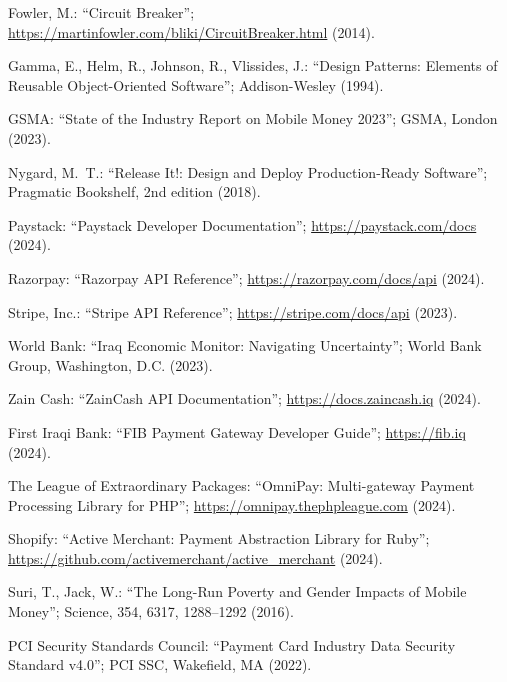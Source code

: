 \documentclass[10pt, a4paper, oneside]{article}
\begin{document}
\begin{thebibliography}{}{
\fontsize{9pt}{10pt}\selectfont

 Fowler, M.: ``Circuit Breaker''; \url{https://martinfowler.com/bliki/CircuitBreaker.html} (2014).

 Gamma, E., Helm, R., Johnson, R., Vlissides, J.: ``Design Patterns: Elements of Reusable Object-Oriented Software''; Addison-Wesley (1994).

 GSMA: ``State of the Industry Report on Mobile Money 2023''; GSMA, London (2023).

 Nygard, M.~T.: ``Release It!: Design and Deploy Production-Ready Software''; Pragmatic Bookshelf, 2nd edition (2018).

 Paystack: ``Paystack Developer Documentation''; \url{https://paystack.com/docs} (2024).

 Razorpay: ``Razorpay API Reference''; \url{https://razorpay.com/docs/api} (2024).

 Stripe, Inc.: ``Stripe API Reference''; \url{https://stripe.com/docs/api} (2023).

 World Bank: ``Iraq Economic Monitor: Navigating Uncertainty''; World Bank Group, Washington, D.C. (2023).

 Zain Cash: ``ZainCash API Documentation''; \url{https://docs.zaincash.iq} (2024).

 First Iraqi Bank: ``FIB Payment Gateway Developer Guide''; \url{https://fib.iq} (2024).

 The League of Extraordinary Packages: ``OmniPay: Multi-gateway Payment Processing Library for PHP''; \url{https://omnipay.thephpleague.com} (2024).

 Shopify: ``Active Merchant: Payment Abstraction Library for Ruby''; \url{https://github.com/activemerchant/active\_merchant} (2024).

 Suri, T., Jack, W.: ``The Long-Run Poverty and Gender Impacts of Mobile Money''; Science, 354, 6317, 1288--1292 (2016).

 PCI Security Standards Council: ``Payment Card Industry Data Security Standard v4.0''; PCI SSC, Wakefield, MA (2022).

}\end{thebibliography}
\end{document}
